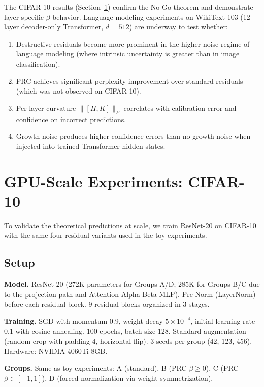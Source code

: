 \documentclass[11pt,a4paper]{article}
\theoremstyle{definition}
\begin{document}
The CIFAR-10 results (Section~\ref{sec:cifar}) confirm the No-Go theorem
and demonstrate layer-specific $\beta$ behavior. Language modeling
experiments on WikiText-103 (12-layer decoder-only Transformer,
$d = 512$) are underway to test whether:
\begin{enumerate}[nosep]
  \item Destructive residuals become more prominent in the higher-noise
        regime of language modeling (where intrinsic uncertainty is greater
        than in image classification).
  \item PRC achieves significant perplexity improvement over standard
        residuals (which was not observed on CIFAR-10).
  \item Per-layer curvature $\|[H,K]\|_F$ correlates with calibration
        error and confidence on incorrect predictions.
  \item Growth noise produces higher-confidence errors than no-growth
        noise when injected into trained Transformer hidden states.
\end{enumerate}

\section{GPU-Scale Experiments: CIFAR-10}
\label{sec:cifar}

To validate the theoretical predictions at scale, we train ResNet-20
on CIFAR-10 with the same four residual variants used in the toy
experiments.

\subsection{Setup}

\textbf{Model.} ResNet-20 (272K parameters for Groups A/D; 285K for
Groups B/C due to the projection path and Attention Alpha-Beta MLP).
Pre-Norm (LayerNorm) before each residual block. 9 residual blocks
organized in 3 stages.

\textbf{Training.} SGD with momentum 0.9, weight decay $5 \times 10^{-4}$,
initial learning rate 0.1 with cosine annealing. 100 epochs, batch size
128. Standard augmentation (random crop with padding 4, horizontal flip).
3 seeds per group (42, 123, 456). Hardware: NVIDIA 4060Ti 8GB.

\textbf{Groups.} Same as toy experiments: A (standard), B (PRC $\beta \geq 0$),
C (PRC $\beta \in [-1,1]$), D (forced normalization via weight symmetrization).
\end{document}
